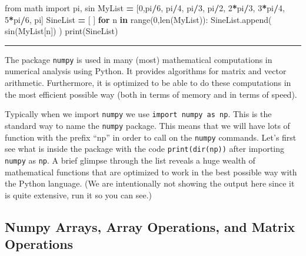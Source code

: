 \documentclass[
]{book}
\newenvironment{Shaded}{\begin{snugshade}}{\end{snugshade}}
\newcommand{\BuiltInTok}[1]{#1}
\newcommand{\ControlFlowTok}[1]{\textcolor[rgb]{0.13,0.29,0.53}{\textbf{#1}}}
\newcommand{\DecValTok}[1]{\textcolor[rgb]{0.00,0.00,0.81}{#1}}
\newcommand{\ImportTok}[1]{#1}
\newcommand{\KeywordTok}[1]{\textcolor[rgb]{0.13,0.29,0.53}{\textbf{#1}}}
\newcommand{\NormalTok}[1]{#1}
\newcommand{\OperatorTok}[1]{\textcolor[rgb]{0.81,0.36,0.00}{\textbf{#1}}}
\theoremstyle{definition}
\theoremstyle{definition}
\theoremstyle{definition}
\theoremstyle{remark}
\begin{document}
\begin{Shaded}
\begin{Highlighting}[]
\ImportTok{from}\NormalTok{ math }\ImportTok{import}\NormalTok{ pi, sin}
\NormalTok{MyList }\OperatorTok{=}\NormalTok{ [}\DecValTok{0}\NormalTok{,pi}\OperatorTok{/}\DecValTok{6}\NormalTok{, pi}\OperatorTok{/}\DecValTok{4}\NormalTok{, pi}\OperatorTok{/}\DecValTok{3}\NormalTok{, pi}\OperatorTok{/}\DecValTok{2}\NormalTok{, }\DecValTok{2}\OperatorTok{*}\NormalTok{pi}\OperatorTok{/}\DecValTok{3}\NormalTok{, }\DecValTok{3}\OperatorTok{*}\NormalTok{pi}\OperatorTok{/}\DecValTok{4}\NormalTok{, }\DecValTok{5}\OperatorTok{*}\NormalTok{pi}\OperatorTok{/}\DecValTok{6}\NormalTok{, pi]}
\NormalTok{SineList }\OperatorTok{=}\NormalTok{ [ ]}
\ControlFlowTok{for}\NormalTok{ n }\KeywordTok{in} \BuiltInTok{range}\NormalTok{(}\DecValTok{0}\NormalTok{,}\BuiltInTok{len}\NormalTok{(MyList)):}
\NormalTok{    SineList.append( sin(MyList[n]) )}
\BuiltInTok{print}\NormalTok{(SineList)}
\end{Highlighting}
\end{Shaded}

\begin{center}\rule{0.5\linewidth}{0.5pt}\end{center}

The package \texttt{numpy} is used in many (most) mathematical computations in numerical analysis using Python. It provides algorithms for matrix and vector arithmetic. Furthermore, it is optimized to be able to do these computations in the most efficient possible way (both in terms of memory and in terms of speed).

Typically when we import \texttt{numpy} we use \texttt{import\ numpy\ as\ np}. This is the standard way to name the \texttt{numpy} package. This means that we will have lots of function with the prefix ``np'' in order to call on the \texttt{numpy} commands. Let's first see what is inside the package with the code \texttt{print(dir(np))} after importing \texttt{numpy} as \texttt{np}. A brief glimpse through the list reveals a huge wealth of mathematical functions that are optimized to work in the best possible way with the Python language. (We are intentionally not showing the output here since it is quite extensive, run it so you can see.)

\hypertarget{numpy-arrays-array-operations-and-matrix-operations}{%
\subsection{Numpy Arrays, Array Operations, and Matrix Operations}\label{numpy-arrays-array-operations-and-matrix-operations}}
\end{document}
